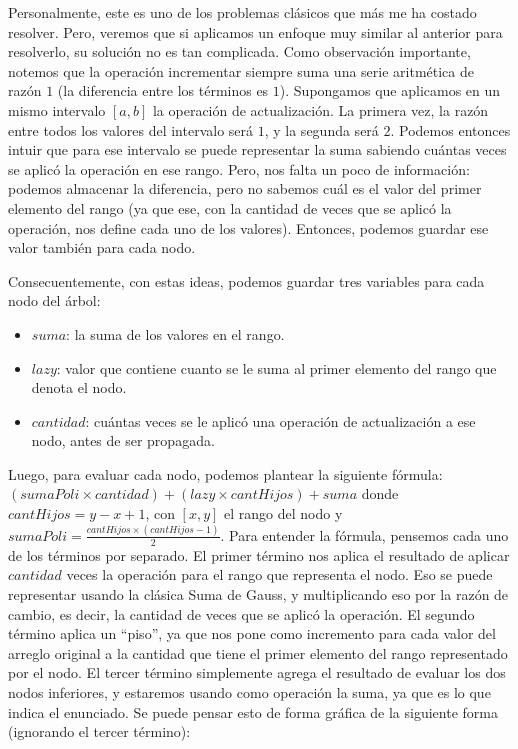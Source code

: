 \documentclass{article}
\begin{document}
Personalmente, este es uno de los problemas clásicos que más me ha costado resolver. Pero, veremos que si aplicamos un enfoque muy similar al anterior para resolverlo, su solución no es tan complicada. Como observación importante, notemos que la operación incrementar siempre suma una serie aritmética de razón $1$ (la diferencia entre los términos es $1$). Supongamos que aplicamos en un mismo intervalo $[a,b]$ la operación de actualización. La primera vez, la razón entre todos los valores del intervalo será $1$, y la segunda será $2$. Podemos entonces intuir que para ese intervalo se puede representar la suma sabiendo cuántas veces se aplicó la operación en ese rango. Pero, nos falta un poco de información: podemos almacenar la diferencia, pero no sabemos cuál es el valor del primer elemento del rango (ya que ese, con la cantidad de veces que se aplicó la operación, nos define cada uno de los valores). Entonces, podemos guardar ese valor también para cada nodo.

Consecuentemente, con estas ideas, podemos guardar tres variables para cada nodo del árbol:
\begin{itemize}
    \item $suma$: la suma de los valores en el rango.
    \item $lazy$: valor que contiene cuanto se le suma al primer elemento del rango que denota el nodo.
    \item $cantidad$: cuántas veces se le aplicó una operación de actualización a ese nodo, antes de ser propagada.
\end{itemize}

Luego, para evaluar cada nodo, podemos plantear la siguiente fórmula: $(sumaPoli \times cantidad) + (lazy \times cantHijos) + suma$ donde $cantHijos = y - x + 1$, con $[x,y]$ el rango del nodo y $sumaPoli = \frac{cantHijos \times (cantHijos-1)}{2}$. Para entender la fórmula, pensemos cada uno de los términos por separado. El primer término nos aplica el resultado de aplicar $cantidad$ veces la operación para el rango que representa el nodo. Eso se puede representar usando la clásica Suma de Gauss, y multiplicando eso por la razón de cambio, es decir, la cantidad de veces que se aplicó la operación. El segundo término aplica un ``piso'', ya que nos pone como incremento para cada valor del arreglo original a la cantidad que tiene el primer elemento del rango representado por el nodo. El tercer término simplemente agrega el resultado de evaluar los dos nodos inferiores, y estaremos usando como operación la suma, ya que es lo que indica el enunciado. Se puede pensar esto de forma gráfica de la siguiente forma (ignorando el tercer término):
\end{document}
